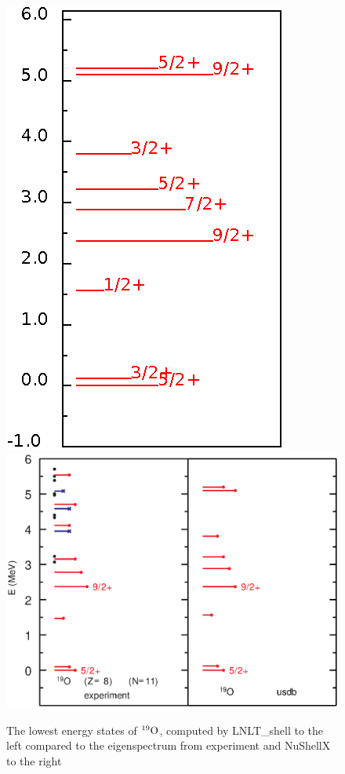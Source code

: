 \begin{figure}[ht!]
\includegraphics{ox19.eps}
\includegraphics[scale=0.56,trim=0cm 2.3cm 0cm 0cm]{o_19b.eps}
\caption{The lowest energy states of $^{19}\rm{O}$, computed by LNLT\_shell to the left compared to the eigenspectrum from experiment and NuShellX to the right}
\label{fig:ox19eig}
\end{figure}

